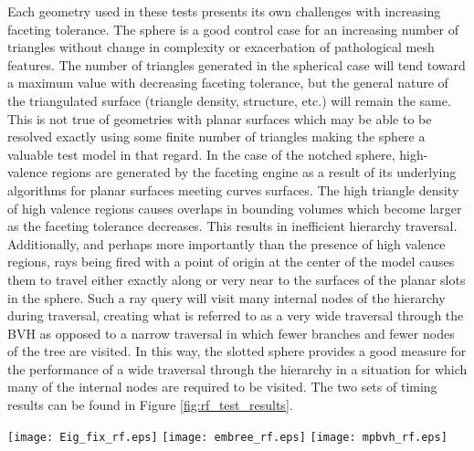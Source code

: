 Each geometry used in these tests presents its own challenges with increasing
faceting tolerance. The sphere is a good control case for an increasing number
of triangles without change in complexity or exacerbation of pathological mesh
features. The number of triangles generated in the spherical case will tend
toward a maximum value with decreasing faceting tolerance, but the general
nature of the triangulated surface (triangle density, structure, etc.)  will
remain the same. This is not true of geometries with planar surfaces which may
be able to be resolved exactly using some finite number of triangles making the
sphere a valuable test model in that regard. In the case of the notched sphere,
high-valence regions are generated by the faceting engine as a result of its
underlying algorithms for planar surfaces meeting curves surfaces. The high
triangle density of high valence regions causes overlaps in bounding volumes
which become larger as the faceting tolerance decreases. This results in
inefficient hierarchy traversal. Additionally, and perhaps more importantly than
the presence of high valence regions, rays being fired with a point of origin at
the center of the model causes them to travel either exactly along or very near
to the surfaces of the planar slots in the sphere. Such a ray query will visit
many internal nodes of the hierarchy during traversal, creating what is referred
to as a very wide traversal through the BVH as opposed to a narrow traversal in
which fewer branches and fewer nodes of the tree are visited. In this way, the
slotted sphere provides a good measure for the performance of a wide traversal
through the hierarchy in a situation for which many of the internal nodes are
required to be visited. The two sets of timing results can be found in Figure
\ref{fig:rf_test_results}.

\begin{sidewaysfigure}[]
  \centering
  \texttt{[image: Eig\_fix\_rf.eps]}
  \texttt{[image: embree\_rf.eps]}
  \texttt{[image: mpbvh\_rf.eps]}
  \caption[Ray fire test results all DAGMC implementations.]{Ray fire test
    results on three representative DAGMC volumes shown in Figure
    \ref{models}. Each data point represents the average ray fire time for 600k
    randomly directed rays from the origin of each volume. Top Left: Results of
    the tests for MOAB's OBB Tree. Top Right: Results of the tests for DAGMC
    coupled with Embree, or EmDAG. Bottom: Ray fire test results for DAGMC
    coupled with the MPBVH. The scale used for the MOAB OBB Tree is 10x greater
    than in the other two cases due its lower performance.}
  \label{fig:rf_test_results}
\end{sidewaysfigure}

